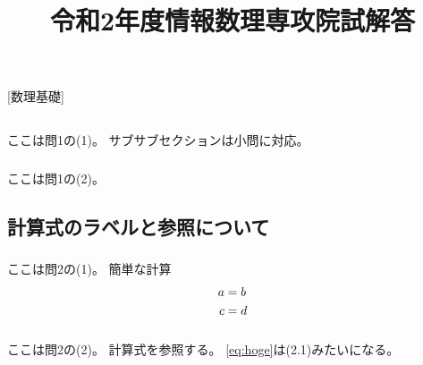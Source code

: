 \documentclass[a4paper,uplatex]{jsarticle}
\title{令和2年度情報数理専攻院試解答}
\date{}
\author{}
\begin{document}
\maketitle

{\Large [数理基礎]}
\subsection{}

\subsubsection{}

ここは問1の(1)。
サブサブセクションは小問に対応。

\subsubsection{}

ここは問1の(2)。

\subsection{計算式のラベルと参照について}

\subsubsection{}

ここは問2の(1)。
簡単な計算
\begin{align}
  a & = b \notag          \\
  c & = d \label{eq:hoge} %
\end{align}

\subsubsection{}

ここは問2の(2)。
計算式を参照する。
\eqref{eq:hoge}は(2.1)みたいになる。
\end{document}
